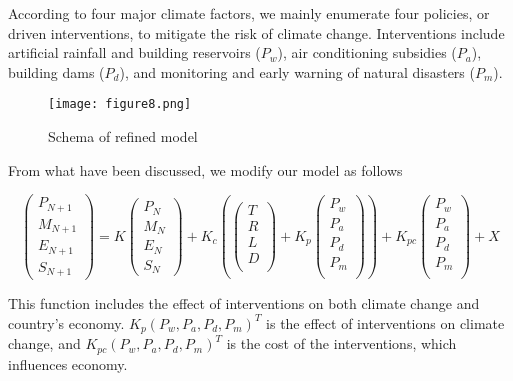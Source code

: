 \documentclass{mcmthesis}
\begin{document}
	According to four major climate factors, we mainly enumerate four policies, or driven interventions, to mitigate the risk of climate change. Interventions include artificial rainfall and building reservoirs ($P_w$), air conditioning subsidies ($P_a$), building dams ($P_d$), and monitoring and early warning of natural disasters ($P_m$).
	
	\begin{figure}[h]
		\small
		\centering
		\texttt{[image: figure8.png]}
		\caption{Schema of refined model} \label{fig:Schema of refined model}
	\end{figure}
	
	From what have been discussed, we modify our model as follows
	  	\begin{spacing}{1.5}
	  	$$
	  	\left(
	  	\begin{matrix}
	  	P_{N+1} \\ M_{N+1} \\ E_{N+1} \\ S_{N+1}
	  	\end{matrix}
	  	\right) 
	  	= 
	  	K 
	  	\left(
	  	\begin{matrix}
	  	P_N \\ M_N \\ E_N \\ S_N
	  	\end{matrix}
	  	\right) 
	  	+
	  	K_c
	  	\left(
	  	\left(
	  	\begin{matrix}
	  	T \\ R \\ L \\ D \\
	  	\end{matrix}
	  	\right)
	  	+ 
	  	K_p
	  	\left(
	  	\begin{matrix}
	  	P_w \\ P_a \\ P_d \\ P_m \\
	  	\end{matrix}
	  	\right)
	  	\right)
	  	+
	  	K_{pc}
	  	\left(
	  	\begin{matrix}
	  	P_w \\ P_a \\ P_d \\ P_m \\
	  	\end{matrix}
	  	\right)
	  	+ X
	  	$$
	  \end{spacing}
	This function includes the effect of interventions on both climate change and country's economy. $K_p (P_w, P_a, P_d, P_m)^T$ is the effect of interventions on climate change, and $K_{pc} (P_w, P_a, P_d, P_m)^T$ is the cost of the interventions, which influences economy.
	
\end{document}
